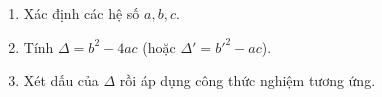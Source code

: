 \begin{enumerate}
\item Xác định các hệ số $a, b, c$.
\item Tính $\Delta = b^2 - 4ac$ (hoặc $\Delta' = b'^2 - ac$).
\item Xét dấu của $\Delta$ rồi áp dụng công thức nghiệm tương ứng.
\end{enumerate}
